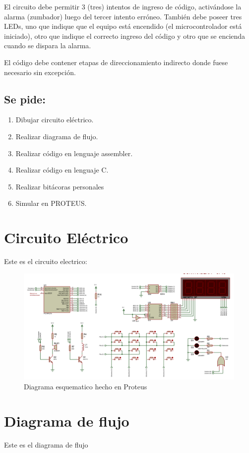 \documentclass{article}
\renewcommand{\labelenumi}{\alph{enumi})}
\begin{document}
El circuito debe permitir 3 (tres) intentos de ingreso de código, 
activándose la alarma (zumbador) luego del tercer intento erróneo.
También debe poseer tres LEDs, uno que indique que el equipo está encendido 
(el microcontrolador está iniciado), otro que indique el correcto ingreso
del código y otro que se encienda cuando se dispara la alarma. 

El código debe contener etapas de direccionamiento indirecto donde 
fuese necesario sin excepción. 
 
	\subsection{Se pide:}
	\renewcommand{\labelenumi}{\alph{enumi})}
	\begin{enumerate}
		\item Dibujar circuito eléctrico. 
		\item Realizar diagrama de flujo. 
		\item Realizar código en lenguaje assembler. 
		\item Realizar código en lenguaje C. 
		\item Realizar bitácoras personales 
		\item Simular en PROTEUS. 
	\end{enumerate}
		
\section{Circuito Eléctrico}
Este es el circuito electrico:

\begin{figure}[H]
	\centering
	\includegraphics[width = \textwidth]{diagrama_esquematico.png}
	\caption{Diagrama esquematico hecho en Proteus}
\end{figure}

\section{Diagrama de flujo}
Este es el diagrama de flujo
\end{document}
